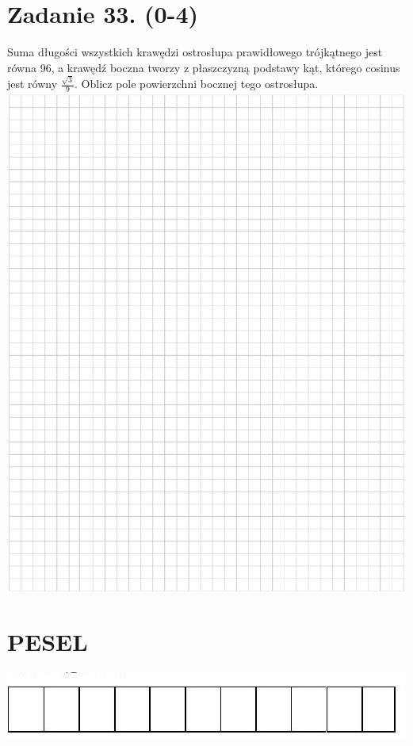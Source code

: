 \documentclass[10pt]{article}
\begin{document}
\section*{Zadanie 33. (0-4)}
Suma długości wszystkich krawędzi ostrosłupa prawidłowego trójkątnego jest równa 96, a krawędź boczna tworzy z płaszczyzną podstawy kąt, którego cosinus jest równy \(\frac{\sqrt{3}}{9}\). Oblicz pole powierzchni bocznej tego ostrosłupa.\\
\includegraphics[max width=\textwidth, center]{2024_11_21_94f02db55673a8a7b820g-19}

\section*{PESEL}
\begin{center}
\includegraphics[max width=\textwidth]{2024_11_21_94f02db55673a8a7b820g-20(1)}
\end{center}
\end{document}
